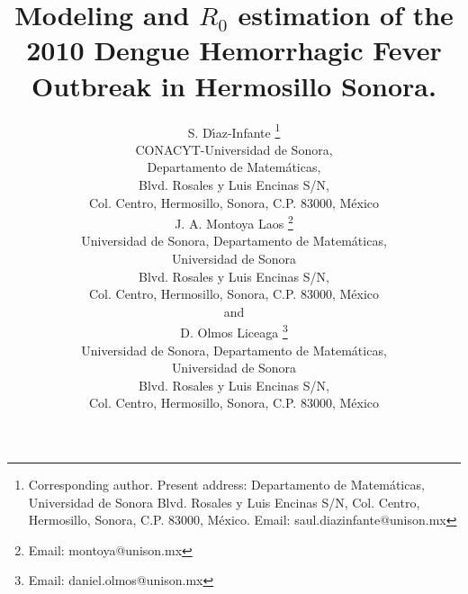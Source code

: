 \documentclass[11pt]{imammb}
\numberwithin{equation}{section}
\begin{document}
    \title{
        Modeling and $R_0$ estimation  of the 2010 Dengue Hemorrhagic Fever
        Outbreak in Hermosillo Sonora.
    }
    \author{%
        {\sc S. D\'{\i}az-Infante%
            \footnote{
                Corresponding author.
                Present address: Departamento de Matem\'aticas,
                Universidad de Sonora Blvd. Rosales y Luis Encinas S/N,
                Col. Centro, Hermosillo, Sonora, C.P. 83000,
                M\'exico. Email: saul.diazinfante@unison.mx
                }
        }\\[2pt]
        CONACYT-Universidad de Sonora, \\[6pt]
        Departamento de Matem\'aticas, \\[6pt]
        Blvd. Rosales y Luis Encinas S/N, \\[6pt]
        Col. Centro, Hermosillo, Sonora, C.P. 83000,
        M\'exico\\
        {\sc J. A. Montoya Laos
            \footnote{Email: montoya@unison.mx}
        }\\[2pt]
        Universidad de Sonora,
        Departamento de Matem\'aticas, \\[6pt]
        Universidad de Sonora \\[6pt]
        Blvd. Rosales y Luis Encinas S/N, \\[6pt]
        Col. Centro, Hermosillo, Sonora, C.P. 83000,
        M\'exico\\
        { \sc and
            \\
             D. Olmos Liceaga
            \footnote{Email: daniel.olmos@unison.mx}
        }\\[2pt]
        Universidad de Sonora,
        Departamento de Matem\'aticas, \\[6pt]
        Universidad de Sonora \\[6pt]
        Blvd. Rosales y Luis Encinas S/N, \\[6pt]
        Col. Centro, Hermosillo, Sonora, C.P. 83000,
        M\'exico\\
    }
%
    \pagestyle{headings}
    \maketitle
\end{document}
